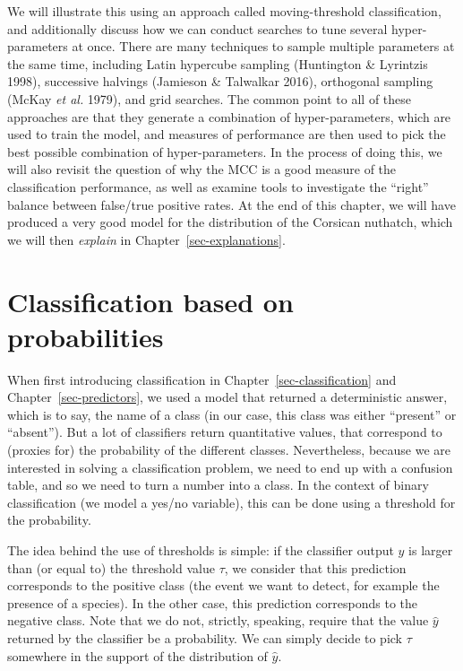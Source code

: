 \documentclass[
  letterpaper,
]{scrbook}
\begin{document}
We will illustrate this using an approach called moving-threshold
classification, and additionally discuss how we can conduct searches to
tune several hyper-parameters at once. There are many techniques to
sample multiple parameters at the same time, including Latin hypercube
sampling (Huntington \& Lyrintzis 1998), successive halvings (Jamieson
\& Talwalkar 2016), orthogonal sampling (McKay \emph{et al.} 1979), and
grid searches. The common point to all of these approaches are that they
generate a combination of hyper-parameters, which are used to train the
model, and measures of performance are then used to pick the best
possible combination of hyper-parameters. In the process of doing this,
we will also revisit the question of why the MCC is a good measure of
the classification performance, as well as examine tools to investigate
the ``right'' balance between false/true positive rates. At the end of
this chapter, we will have produced a very good model for the
distribution of the Corsican nuthatch, which we will then \emph{explain}
in Chapter~\ref{sec-explanations}.

\section{Classification based on
probabilities}\label{sec-learningcurves-threshold}

When first introducing classification in
Chapter~\ref{sec-classification} and Chapter~\ref{sec-predictors}, we
used a model that returned a deterministic answer, which is to say, the
name of a class (in our case, this class was either ``present'' or
``absent''). But a lot of classifiers return quantitative values, that
correspond to (proxies for) the probability of the different classes.
Nevertheless, because we are interested in solving a classification
problem, we need to end up with a confusion table, and so we need to
turn a number into a class. In the context of binary classification (we
model a yes/no variable), this can be done using a threshold for the
probability.


The idea behind the use of thresholds is simple: if the classifier
output \(\hat y\) is larger than (or equal to) the threshold value
\(\tau\), we consider that this prediction corresponds to the positive
class (the event we want to detect, for example the presence of a
species). In the other case, this prediction corresponds to the negative
class. Note that we do not, strictly, speaking, require that the value
\(\hat y\) returned by the classifier be a probability. We can simply
decide to pick \(\tau\) somewhere in the support of the distribution of
\(\hat y\).
\end{document}
